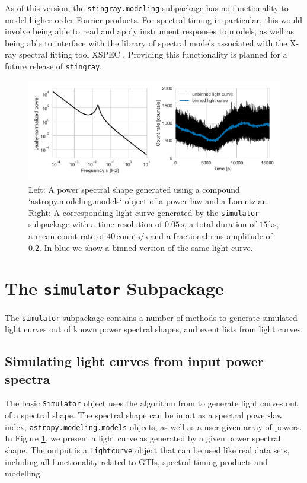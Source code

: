 \documentclass[twocolumn]{aastex62}
\newcommand{\stingray}{\texttt{stingray}\xspace}
\begin{document}
As of this version, the \verb|stingray.modeling| subpackage has no functionality to model higher-order Fourier products. For spectral timing in particular, this would involve being able to read and apply instrument responses to models, as well as being able to interface with the library of spectral models associated with the X-ray spectral fitting tool XSPEC \citep{arnaud1996}. Providing this functionality is planned for a future release of \stingray. 



\begin{figure}[htbp]
\begin{center}
\includegraphics[width=\linewidth]{../figures/sim_lc.pdf}
\caption{Left: A power spectral shape generated using a compound `astropy.modeling.models` object of a power law and a Lorentzian. Right: A corresponding light curve generated by the \texttt{simulator} subpackage with a time resolution of $0.05\,\mathrm{s}$, a total duration of $15\,\mathrm{ks}$, a mean count rate of $40\,\mathrm{counts}/\mathrm{s}$ and a fractional rms amplitude of $0.2$. In blue we show a binned version of the same light curve.}
\label{fig:sim_lc}
\end{center}
\end{figure}

\section{The \texttt{simulator} Subpackage}
\label{sec:simulator}

The \texttt{simulator} subpackage contains a number of methods to generate simulated light curves out of known power spectral shapes, and event lists from light curves. 

\subsection{Simulating light curves from input power spectra}
The basic \texttt{Simulator} object uses the algorithm from \citet{timmer1995} to generate light curves out of a spectral shape. 
The spectral shape can be input as a spectral power-law index, \texttt{astropy.modeling.models} objects, as well as a user-given array of powers.
In Figure \ref{fig:sim_lc}, we present a light curve as generated by a given power spectral shape. 
The output is a \texttt{Lightcurve} object that can be used like real data sets, including all functionality related to GTIs, spectral-timing products and modelling. 
\end{document}
